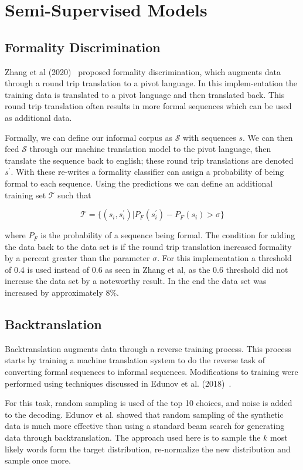 \documentclass[12pt]{article}
\begin{document}
\section{Semi-Supervised Models}
\subsection{Formality Discrimination}
Zhang et al (2020)~\cite{paralleldataaug} proposed formality discrimination, which  
augments data through a round trip translation to a pivot language. In this implem-entation 
the training data is translated 
to a pivot language and then translated back. This round trip translation often results in more 
formal sequences which can be used as additional data. \par
Formally, we can define our informal corpus as $\mathcal{S}$  with sequences $s$. We can then 
feed $\mathcal{S}$ through our machine translation model to the pivot language, then translate 
the sequence back to english; these round trip translations are denoted $s^\prime$. 
With these re-writes a formality classifier can assign a probability 
of being formal to each sequence. Using the predictions we can define an additional training set 
$\mathcal{T}$ such that 


$$\mathcal{T} = \{(s_i, s_i^\prime)|P_F(s_i^\prime) - P_F(s_i) > \sigma \}$$ 

where $P_F$ is the probability of a sequence being formal. The condition for adding the data
back to the data set is if the round trip translation increased formality by a percent greater
than the parameter $\sigma$. For this implementation a threshold of 0.4 is used instead of 0.6 as seen
in Zhang et al, as the 0.6 threshold did not increase the data set by a noteworthy result. 
In the end the data set was increased by approximately 8\%. 

\subsection{Backtranslation}
Backtranslation augments data through a reverse training process. This process starts by 
training a machine translation system to do the reverse task of converting formal sequences 
to informal sequences. Modifications to training were performed using techniques discussed in 
Edunov et al. (2018)~\cite{backtranslation}. \par 

For this task, random sampling is used of the 
top 10 choices, and noise is added to the decoding. Edunov et al. showed that random sampling 
of the synthetic data is much more effective than using a standard beam search for generating data through
backtranslation. The approach used here is to sample the $k$ most likely 
words form the target distribution, re-normalize the new distribution and sample once more. \par
\end{document}
